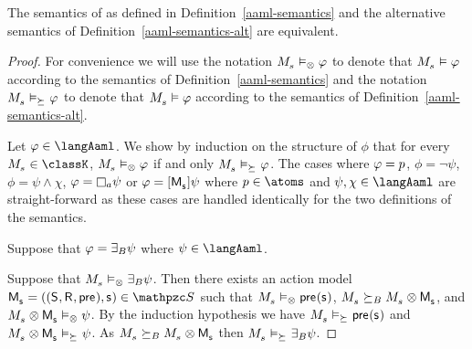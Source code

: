 \begin{corollary}
The semantics of \logicAamlK{} as defined in Definition~\ref{aaml-semantics} and the alternative semantics of Definition~\ref{aaml-semantics-alt} are equivalent.
\end{corollary}

\begin{proof}
For convenience we will use the notation $\kPModel{\kStateS} \entails_\exec \phi$ to denote that $\kPModel{\kStateS} \entails \phi$ according to the semantics of Definition~\ref{aaml-semantics} and the notation $\kPModel{\kStateS} \entails_{\simulates} \phi$ to denote that $\kPModel{\kStateS} \entails \phi$ according to the semantics of Definition~\ref{aaml-semantics-alt}.

Let $\phi \in \langAaml$.
We show by induction on the structure of $\phi$ that for every $\kPModel{\kStateS} \in \classK$, $\kPModel{\kStateS} \entails_\exec \phi$ if and only $\kPModel{\kStateS} \entails_{\simulates} \phi$.
The cases where $\varphi = p$, $\phi = \lnot \psi$,  $\phi = \psi \land \chi$, $\phi = \necessaryA \psi$ or $\phi = \actionA{\aPModel{\aStateS}} \psi$ where $\atomP \in \atoms$ and $\psi, \chi \in \langAaml$ are straight-forward as these cases are handled identically for the two definitions of the semantics.

Suppose that $\varphi = {\exists_{B}} \psi$ where $\psi \in \langAaml$.

Suppose that $\kPModel{\kStateS} \entails_\exec \someactsBs \psi$.
Then there exists an action model $\aPModelAndTuple{\aStateS} \in \aSignatureFamily$ such that $\kPModel{\kStateS} \entails_\exec \aPrecondition(\aStateS)$, $\kPModel{\kStateS} \simulatesBs \kPModel{\kStateS} \exec \aPModel{\aStateS}$, and $\kPModel{\kStateS} \exec \aPModel{\aStateS} \entails_\exec \psi$.
By the induction hypothesis we have $\kPModel{\kStateS} \entails_{\simulates} \aPrecondition(\aStateS)$ and $\kPModel{\kStateS} \exec \aPModel{\aStateS} \entails_{\simulates} \psi$.
As $\kPModel{\kStateS} \simulatesBs \kPModel{\kStateS} \exec \aPModel{\aStateS}$ then $\kPModel{\kStateS} \entails_{\simulates} \someactsBs \psi$.


\end{proof}
